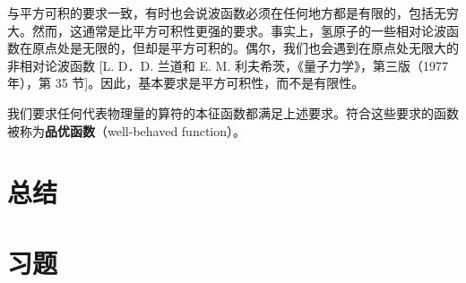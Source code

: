 	与平方可积的要求一致，有时也会说波函数必须在任何地方都是有限的，包括无穷大。然而，这通常是比平方可积性更强的要求。事实上，氢原子的一些相对论波函数在原点处是无限的，但却是平方可积的。偶尔，我们也会遇到在原点处无限大的非相对论波函数 [L. D．D. 兰道和 E. M. 利夫希茨，《量子力学》，第三版（1977 年），第 35 节]。因此，基本要求是平方可积性，而不是有限性。

	我们要求任何代表物理量的算符的本征函数都满足上述要求。符合这些要求的函数被称为\textbf{品优函数}（well-behaved function）。

\section*{总结}

\section*{习题}